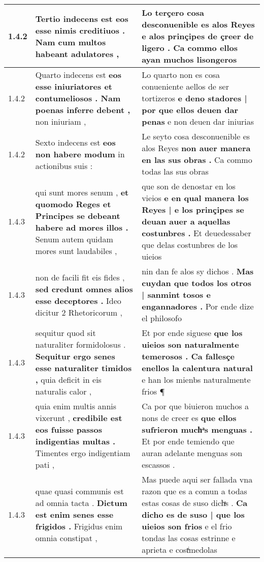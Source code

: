 \begin{tabular}{|p{1cm}|p{6.5cm}|p{6.5cm}|}
1.4.2 & Tertio indecens est \textbf{ eos esse nimis creditiuos . } Nam cum multos habeant adulatores , & Lo terçero cosa desconuenible es alos Reyes \textbf{ e alos prinçipes de çreer de ligero . } Ca commo ellos ayan muchos lisongeros \\\hline
1.4.2 & Quarto indecens est \textbf{ eos esse iniuriatores et contumeliosos . Nam poenas inferre debent , } non iniuriam , & Lo quarto non es cosa conueniente aellos de ser tortizeros \textbf{ e deno stadores | por que ellos deuen dar penas } e non deuen dar iniurias \\\hline
1.4.2 & Sexto indecens est \textbf{ eos non habere modum } in actionibus suis : & Le seyto cosa desconuenible es alos Reyes \textbf{ non auer manera en las sus obras . } Ca commo todas las sus obras \\\hline
1.4.3 & qui sunt mores senum , \textbf{ et quomodo Reges et Principes se debeant habere ad mores illos . } Senum autem quidam mores sunt laudabiles , & que son de denostar en los vieios \textbf{ e en qual manera los Reyes | e los prinçipes se deuan auer a aquellas costunbres . } Et deuedessaber que delas costunbres de los uieios \\\hline
1.4.3 & non de facili fit eis fides , \textbf{ sed credunt omnes alios esse deceptores . } Ideo dicitur 2 Rhetoricorum , & nin dan fe alos sy dichos . \textbf{ Mas cuydan que todos los otros | sanmint tosos e engannadores . } Por ende dize el philosofo \\\hline
1.4.3 & sequitur quod sit naturaliter formidolosus . \textbf{ Sequitur ergo senes esse naturaliter timidos , } quia deficit in eis naturalis calor , & Et por ende siguese \textbf{ que los uieios son naturalmente temerosos . Ca fallesçe enellos la calentura natural } e han los mienbs naturalmente frios ¶ \\\hline
1.4.3 & quia enim multis annis vixerunt , \textbf{ credibile est eos fuisse passos indigentias multas . } Timentes ergo indigentiam pati , & Ca por que biuieron muchos a nons de creer es \textbf{ que ellos sufrieron muchͣs menguas . } Et por ende temiendo que auran adelante menguas son escassos . \\\hline
1.4.3 & quae quasi communis est ad omnia tacta . \textbf{ Dictum est enim senes esse frigidos . } Frigidus enim omnia constipat , & Mas puede aqui ser fallada vna razon que es a comun a todas estas cosas de suso dichͣs . \textbf{ Ca dicho es de suso | que los uieios son frios } e el frio tondas las cosas estrinne e aprieta e costͥmedolas \\\hline

\end{tabular}
